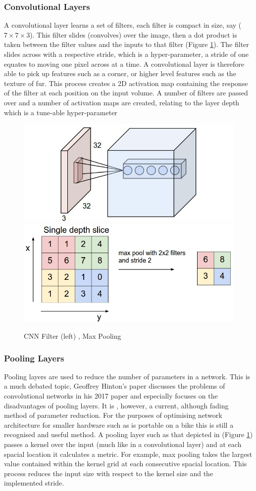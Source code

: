 \documentclass[11pt,twoside]{report}
\begin{document}
\subsubsection{Convolutional Layers}
A convolutional layer learns a set of filters, each filter is compact in size, say ($7 \times 7 \times 3$). This filter slides (convolves) over the image, then a dot product is taken between the filter values and the inputs to that filter (Figure \ref{CNN_filter}). The filter slides across with a respective stride, which is a hyper-parameter, a stride of one equates to moving one pixel across at a time. A convolutional layer is therefore able to pick up features such as a corner, or higher level features such as the texture of fur. This process creates a 2D activation map containing the response of the filter at each position on the input volume. A number of filters are passed over and a number of activation maps are created, relating to the layer depth which is a tune-able hyper-parameter

\noindent \begin{figure}[h!]
	\includegraphics[width = 0.5\hsize]{./figures/conv_filter.jpg}
	\includegraphics[width = 0.5\hsize]{./figures/maxpool.jpeg}
	\caption{CNN Filter (left) \cite{StanfordCS231_conv_filter}, Max Pooling \cite{StanfordCS231_max_pool}}
	\label{CNN_filter}
\end{figure}

\subsubsection{Pooling Layers}
Pooling layers are used to reduce the number of parameters in a network. This is a much debated topic, Geoffrey Hinton's paper \cite{DBLP:journals/corr/abs-1710-09829} discusses the problems of convolutional networks in his 2017 paper and especially focuses on the disadvantages of pooling layers. It is , however, a current, although fading method of parameter reduction. For the purposes of optimising network architecture for smaller hardware such as is portable on a bike this is still a recognised and useful method.
\newline \newline
A pooling layer such as that depicted in (Figure \ref{CNN_filter}) passes a kernel over the input (much like in a convolutional layer) and at each spacial location it calculates a metric. For example, max pooling takes the largest value contained within the kernel grid at each consecutive spacial location. This process reduces the input size with respect to the kernel size and the implemented stride.
\end{document}

